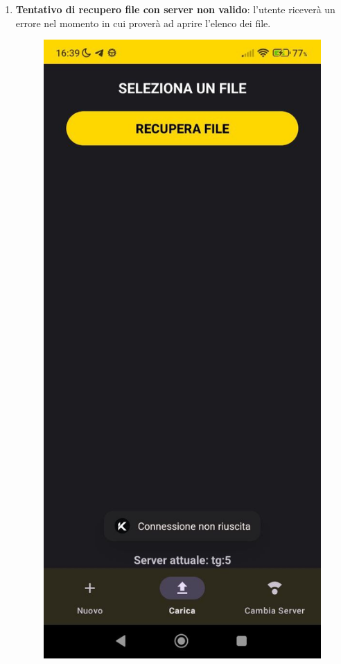 \begin{enumerate}
\begin{figure}[H]
  \end{figure}
  \item \textbf{Tentativo di recupero file con server non valido}: l'utente riceverà un errore nel momento in cui proverà ad aprire l'elenco dei file.
  \begin{figure}[H]
    \centering
    \includegraphics[scale=0.2]{img/app10.png}

\end{figure}
\end{enumerate}
